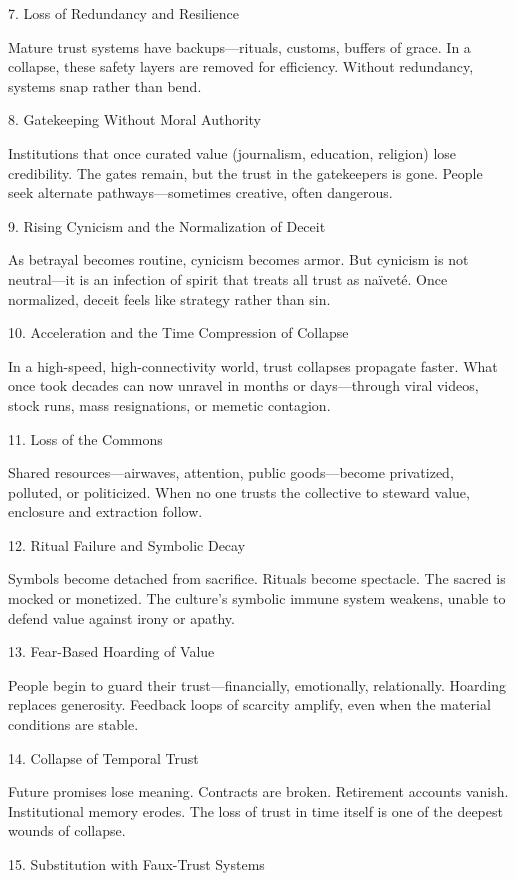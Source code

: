 \documentclass[11pt,oneside]{book}
\begin{document}
7. Loss of Redundancy and Resilience


Mature trust systems have backups—rituals, customs, buffers of grace. In a collapse, these safety layers are removed for efficiency. Without redundancy, systems snap rather than bend.

8. Gatekeeping Without Moral Authority


Institutions that once curated value (journalism, education, religion) lose credibility. The gates remain, but the trust in the gatekeepers is gone. People seek alternate pathways—sometimes creative, often dangerous.

9. Rising Cynicism and the Normalization of Deceit


As betrayal becomes routine, cynicism becomes armor. But cynicism is not neutral—it is an infection of spirit that treats all trust as naïveté. Once normalized, deceit feels like strategy rather than sin.

10. Acceleration and the Time Compression of Collapse


In a high-speed, high-connectivity world, trust collapses propagate faster. What once took decades can now unravel in months or days—through viral videos, stock runs, mass resignations, or memetic contagion.

11. Loss of the Commons


Shared resources—airwaves, attention, public goods—become privatized, polluted, or politicized. When no one trusts the collective to steward value, enclosure and extraction follow.

12. Ritual Failure and Symbolic Decay


Symbols become detached from sacrifice. Rituals become spectacle. The sacred is mocked or monetized. The culture’s symbolic immune system weakens, unable to defend value against irony or apathy.

13. Fear-Based Hoarding of Value


People begin to guard their trust—financially, emotionally, relationally. Hoarding replaces generosity. Feedback loops of scarcity amplify, even when the material conditions are stable.

14. Collapse of Temporal Trust


Future promises lose meaning. Contracts are broken. Retirement accounts vanish. Institutional memory erodes. The loss of trust in time itself is one of the deepest wounds of collapse.

15. Substitution with Faux-Trust Systems
\end{document}
